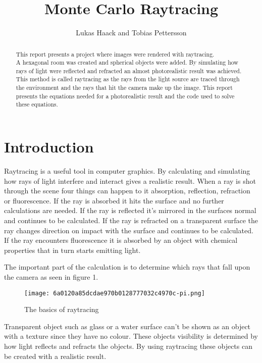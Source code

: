 \documentclass[a4paper,12pt,oneside,final]{report}
\begin{document}
\title{Monte Carlo Raytracing}

\author{Lukas Haack and Tobias Pettersson}

\maketitle
 \begin{abstract}
 This report presents a project where images were rendered with raytracing.\\ A hexagonal room was created and spherical objects were added. By simulating how rays of light were reflected and refracted an almost photorealistic result was achieved. This method is called raytracing as the rays from the light source are traced through the environment and the rays that hit the camera make up the image. This report presents the equations needed for a photorealistic result and the code used to solve these equations. 
 \end{abstract}



\section{Introduction}


Raytracing is a useful tool in computer graphics. By calculating and simulating how rays of light interfere and interact gives a realistic result. When a ray is shot through the scene four things can happen to it absorption, reflection, refraction or fluorescence.
If the ray is absorbed it hits the surface and no further calculations are needed. If the ray is reflected it's mirrored in the surfaces normal and continues to be calculated. If the ray is refracted on a transparent surface the ray changes direction on impact with the surface and continues to be calculated. If the ray encounters fluorescence it is absorbed by an object with chemical properties that in turn starts emitting light.

The important part of the calculation is to determine which rays that fall upon the camera as seen in figure 1. 
\begin{center}
\begin{figure}[h!]
\begin{center}
\texttt{[image: 6a0120a85dcdae970b0128777032c4970c-pi.png]}
\end{center}
\caption{The basics of raytracing}
\end{figure}
\end{center}
Transparent object such as glass or a water surface can't be shown as an object with a texture since they have no colour. 
These objects visibility is determined by how light reflects and refracts the objects. By using raytracing these objects can be created with a realistic result.
\end{document}
